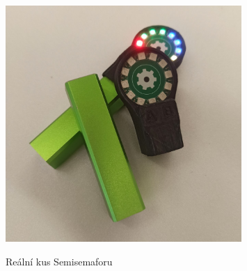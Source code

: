 \begin{figure}[!h]
  \centering
  \includegraphics[width=0.8\textwidth]{text/PraktickaCast/img/Real-SemiSemafor.jpg}
  \label{semisemafor-real}
  \caption{Reální kus Semisemaforu}
\end{figure}

